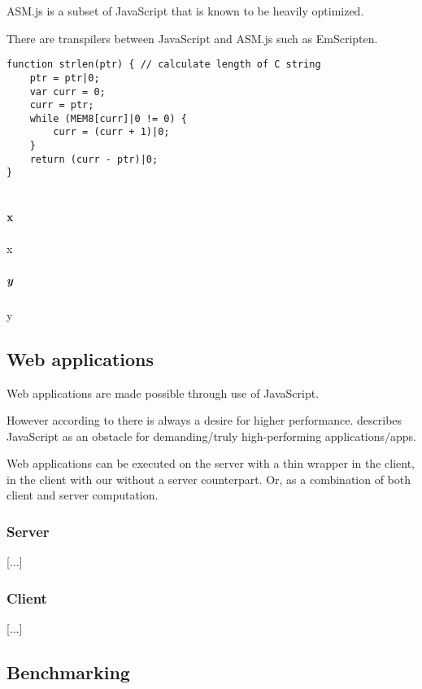 ASM.js is a subset of JavaScript that is known to be heavily optimized.

There are transpilers between JavaScript and ASM.js such as EmScripten.

\begin{verbatim}
function strlen(ptr) { // calculate length of C string
    ptr = ptr|0;
    var curr = 0;
    curr = ptr;
    while (MEM8[curr]|0 != 0) {
        curr = (curr + 1)|0;
    }
    return (curr - ptr)|0;
}
    
\end{verbatim}

\paragraph{x}

x

\subparagraph{y}

y

\subsection{Web applications}

Web applications are made possible through use of JavaScript.

However according to \textcite{ReiserBlaser2017} there is always a desire for higher performance. \textcite{Zakai2018} describes JavaScript as an obstacle for demanding/truly high-performing applications/apps.

Web applications can be executed on the server with a thin wrapper in the client, in the client with our without a server counterpart. Or, as a combination of both client and server computation.

\subsubsection{Server}

[...]

\subsubsection{Client}

[...]

\subsection{Benchmarking}

\parencite{LehmannPradel2018,MalleGiulianiKiesebergHolzinger2018}


